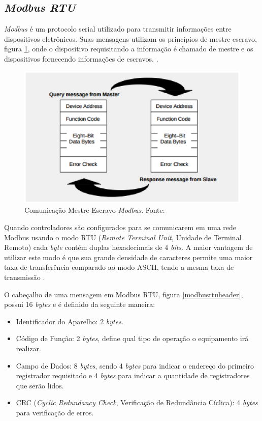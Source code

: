     \subsection{\textit{Modbus RTU}}
    \textit{Modbus} é um protocolo serial utilizado para transmitir informações entre dispositivos eletrônicos. Suas mensagens utilizam os princípios de mestre-escravo, figura \ref{mestre_escravo}, onde o dispositivo requisitando a informação é chamado de mestre e os dispositivos fornecendo informações de escravos. \cite{modbus}.
    \begin{figure}[!htpb]
        \centering
        \includegraphics[keepaspectratio=true,scale=0.8]{figuras/mestre_escravo.eps}
        \caption{Comunicação Mestre-Escravo \textit{Modbus}. Fonte: \cite{modbus}}
        \label{mestre_escravo}
    \end{figure}

    Quando controladores são configurados para se comunicarem em uma rede Modbus usando o modo RTU (\textit{Remote Terminal Unit}, Unidade de Terminal Remoto) cada \textit{byte} contém duplas hexadecimais de 4 \textit{bits}. A maior vantagem de utilizar este modo é que sua grande densidade de caracteres permite uma maior taxa de transferência comparado ao modo ASCII, tendo a mesma taxa de transmissão \cite{modbus}.

    O cabeçalho de uma mensagem em Modbus RTU, figura \ref{modbusrtuheader}, possui 16 \textit{bytes} e é definido da seguinte maneira:
    \begin{itemize}
        \item Identificador do Aparelho: 2 \textit{bytes}.
        \item Código de Função: 2 \textit{bytes}, define qual tipo de operação o equipamento irá realizar.
        \item Campo de Dados: 8 \textit{bytes}, sendo 4 \textit{bytes} para indicar o endereço do primeiro registrador requisitado e 4 \textit{bytes} para indicar a quantidade de registradores que serão lidos.
        \item CRC (\textit{Cyclic Redundancy Check}, Verificação de Redundância Cíclica): 4 \textit{bytes} para verificação de erros.
    \end{itemize}

